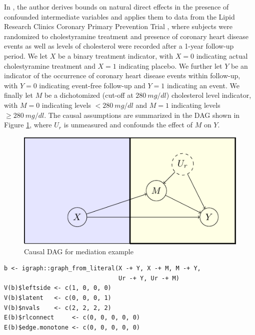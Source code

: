 In \citet{sjolandernaturaldirecteffects}, the author derives bounds on natural direct effects in the presence of confounded intermediate variables and applies them to data from the Lipid Research Clinics Coronary Primary Prevention Trial \citep{freedmandata}, where subjects were randomized to cholestyramine treatment and presence of coronary heart disease events as well as levels of cholesterol were recorded after a 1-year follow-up period.
We let \(X\) be a binary treatment indicator, with \(X=0\) indicating actual cholestyramine treatment and \(X=1\) indicating placebo. We further let \(Y\) be an indicator of the occurrence of coronary heart disease events within follow-up, with \(Y=0\) indicating event-free follow-up and \(Y=1\) indicating an event. We finally let \(M\) be a dichotomized (cut-off at \(280\ mg/dl\)) cholesterol level indicator, with \(M=0\) indicating levels \(<280\ mg/dl\) and \(M=1\) indicating levels \(\ge280\ mg/dl\).
The causal assumptions are summarized in the DAG shown in Figure \ref{fig:mediation-fig}, where \(U_r\) is unmeasured and confounds the effect of \(M\) on \(Y\).

\begin{figure}

{\centering \includegraphics[width=1\linewidth]{causaloptim-paper_files/figure-latex/mediation-fig-1} 

}

\caption{Causal DAG for mediation example}\label{fig:mediation-fig}
\end{figure}

\begin{verbatim}
b <- igraph::graph_from_literal(X -+ Y, X -+ M, M -+ Y, 
                                Ur -+ Y, Ur -+ M)
V(b)$leftside <- c(1, 0, 0, 0)
V(b)$latent   <- c(0, 0, 0, 1)
V(b)$nvals    <- c(2, 2, 2, 2)
E(b)$rlconnect     <- c(0, 0, 0, 0, 0)
E(b)$edge.monotone <- c(0, 0, 0, 0, 0)
\end{verbatim}

